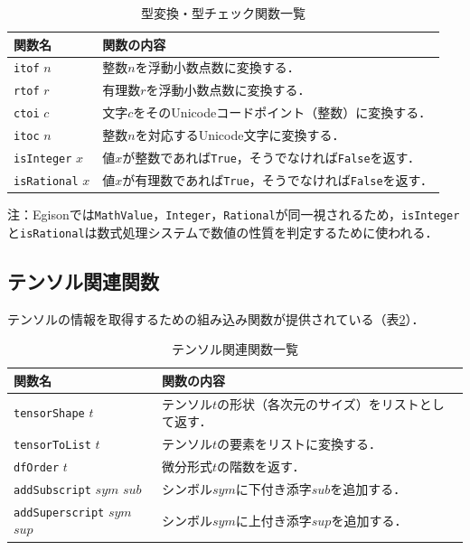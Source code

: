 \begin{table}[h]
  \begin{center}
    \begin{tabular}{ | l | p{9cm} |}
    \hline
    関数名 & 関数の内容 \\ \hline
    \texttt{itof} $n$ & 整数$n$を浮動小数点数に変換する． \\ \hline
    \texttt{rtof} $r$ & 有理数$r$を浮動小数点数に変換する． \\ \hline
    \texttt{ctoi} $c$ & 文字$c$をそのUnicodeコードポイント（整数）に変換する． \\ \hline
    \texttt{itoc} $n$ & 整数$n$を対応するUnicode文字に変換する． \\ \hline
    \texttt{isInteger} $x$ & 値$x$が整数であれば\texttt{True}，そうでなければ\texttt{False}を返す． \\ \hline
    \texttt{isRational} $x$ & 値$x$が有理数であれば\texttt{True}，そうでなければ\texttt{False}を返す． \\ \hline
    \end{tabular}
\end{center}
    \caption{型変換・型チェック関数一覧}
    \label{tab:typeFunctions}
\end{table}

注：Egisonでは\lstinline{MathValue}，\lstinline{Integer}，\lstinline{Rational}が同一視されるため，\lstinline{isInteger}と\lstinline{isRational}は数式処理システムで数値の性質を判定するために使われる．

\subsection{テンソル関連関数}

テンソルの情報を取得するための組み込み関数が提供されている（表\ref{tab:tensorFunctions}）．

\begin{table}[h]
  \begin{center}
    \begin{tabular}{ | l | p{9cm} |}
    \hline
    関数名 & 関数の内容 \\ \hline
    \texttt{tensorShape} $t$ & テンソル$t$の形状（各次元のサイズ）をリストとして返す． \\ \hline
    \texttt{tensorToList} $t$ & テンソル$t$の要素をリストに変換する． \\ \hline
    \texttt{dfOrder} $t$ & 微分形式$t$の階数を返す． \\ \hline
    \texttt{addSubscript} $sym$ $sub$ & シンボル$sym$に下付き添字$sub$を追加する． \\ \hline
    \texttt{addSuperscript} $sym$ $sup$ & シンボル$sym$に上付き添字$sup$を追加する． \\ \hline
    \end{tabular}
\end{center}
    \caption{テンソル関連関数一覧}
    \label{tab:tensorFunctions}
\end{table}

